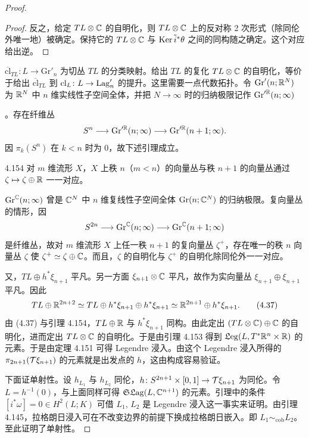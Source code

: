 \begin{proof}
\begin{proof}
    反之，给定 $TL\otimes\mathbb{C}$ 的自明化，则 $TL\otimes\mathbb{C}$ 上的反对称 2 次形式（除同伦外唯一地）被确定。保持它的 $TL\otimes\mathbb{C}$ 与 $\operatorname{Ker}\tilde i^*\theta$ 之间的同构随之确定。这个对应给出逆。
  \end{proof}

  $\overline{\mathrm{cl}}_{TL}\colon L\to\mathrm{Gr}'_n$ 为切丛 $TL$ 的分类映射。给出 $TL$ 的复化 $TL\otimes\mathbb{C}$ 的自明化，等价于给出 $\overline{\mathrm{cl}}_{TL}$ 到 $\mathrm{cl}_L\colon L\to\operatorname{Lag}'_n$ 的提升。这里需要一点代数拓扑。令 $\mathrm{Gr}'(n;\mathbb{R}^N)$ 为 $\mathbb{R}^N$ 中 $n$ 维实线性子空间全体，并把 $N\to\infty$ 时的归纳极限记作 $\mathrm{Gr}'^{\mathbb{R}}(n;\infty)$

  。存在纤维丛
  \[
    S^n\longrightarrow\mathrm{Gr}'^{\mathbb{R}}(n;\infty)\longrightarrow\mathrm{Gr}'^{\mathbb{R}}(n+1;\infty).
  \]
  因 $\pi_k(S^n)$ 在 $k<n$ 时为 0，故下述引理成立。

  \begin{lemma}{4.154}
    对 $m$ 维流形 $X$，$X$ 上秩 $n$（$m<n$）的向量丛与秩 $n+1$ 的向量丛通过 $\zeta\mapsto\zeta\oplus\mathbb{R}$ 一一对应。
  \end{lemma}

  $\operatorname{Gr}^{\mathbb{C}}(n;\infty)$ 曾是 $\mathbb{C}^N$ 中 $n$ 维复线性子空间全体 $\operatorname{Gr}(n;\mathbb{C}^N)$ 的归纳极限。复向量丛的情形，因
  \[
    S^{2n}\longrightarrow\operatorname{Gr}^{\mathbb{C}}(n;\infty)\longrightarrow\operatorname{Gr}^{\mathbb{C}}(n+1;\infty)
  \]
  是纤维丛，故对 $m$ 维流形 $X$ 上任一秩 $n+1$ 的复向量丛 $\zeta^+$，存在唯一的秩 $n$ 向量丛 $\zeta$ 使 $\zeta^+\simeq\zeta\oplus\mathbb{C}$。而且，$\zeta$ 的自明化与 $\zeta^+$ 的自明化除同伦外一一对应。

  又，$TL\oplus h^*\xi_{n+1}$ 平凡。另一方面 $\xi_{n+1}\otimes\mathbb{C}$ 平凡，故作为实向量丛 $\xi_{n+1}\oplus\xi_{n+1}$ 平凡。因此
  \begin{equation}
    TL\oplus\mathbb{R}^{2n+2}\simeq TL\oplus h^*\xi_{n+1}\oplus h^*\xi_{n+1}\simeq\mathbb{R}^{2n+1}\oplus h^*\xi_{n+1}. \tag{4.37}
  \end{equation}
  由 (4.37) 与引理 4.154，$TL\oplus\mathbb{R}$ 与 $h^*\xi_{n+1}$ 同构。由此定出 $(TL\otimes\mathbb{C})\oplus\mathbb{C}$ 的自明化，进而定出 $TL\otimes\mathbb{C}$ 的自明化。于是由引理 4.153 得到 $\mathfrak{L}\mathrm{eg}(L,T^*\mathbb{R}^n\times\mathbb{R})$ 的元素。于是由定理 4.151 可得 Legendre 浸入。由这个 Legendre 浸入所得的 $\pi_{2n+1}(\mathcal{T}\xi_{n+1})$ 的元素就是出发点的 $h$，这由构成容易验证。

  下面证单射性。设 $h_{L_1}$ 与 $h_{L_2}$ 同伦，$h\colon S^{2n+1}\times[0,1]\to\mathcal{T}\xi_{n+1}$ 为同伦。令 $L=h^{-1}(0)$，与上面同样可得 $\mathfrak{S}\mathfrak{L}\mathrm{ag}(L,\mathbb{C}^{n+1})$ 的元素。引理中的条件 $[i^*\omega]=0\in H^2(L;K)$ 可借 $L_1$, $L_2$ 是 Legendre 浸入这一事实来证明。由引理 4.145，拉格朗日浸入可在不改变边界的前提下换成拉格朗日嵌入。即 $L_1\sim_{\mathrm{cob}}L_2$。至此证明了单射性。
\end{proof}

